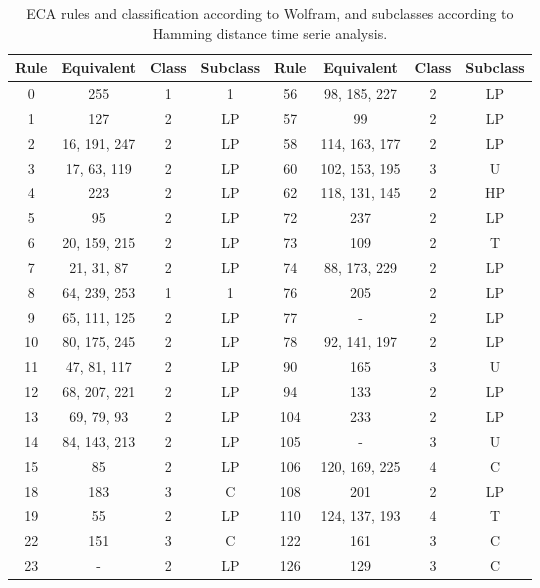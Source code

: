 \setlength{\tabcolsep}{10pt}
\setlength{\tabcolsep}{10pt}
\begin{table}
    \caption{ECA rules and classification according to Wolfram, and subclasses according to Hamming distance time serie analysis.}
    \label{tab:ECAclasses}
    \begin{tabular}{c|c|c|c||c|c|c|c}
        
 Rule & Equivalent & Class & Subclass &   Rule & Equivalent & Class & Subclass \\
        \hline
        0 & 255 & 1 & 1  &               56 & 98, 185, 227 & 2 & LP \\
        1 & 127 & 2 & LP  &              57 & 99 & 2 & LP \\
        2 & 16, 191, 247 & 2 & LP  &     58 & 114, 163, 177 & 2 & LP \\
        3 & 17, 63, 119 & 2 & LP  &      60 & 102, 153, 195 & 3 & U \\
        4 & 223 & 2 & LP  &              62 & 118, 131, 145 & 2 & HP \\
        5 & 95 & 2 & LP  &               72 & 237 & 2 & LP \\
        6 & 20, 159, 215 & 2 & LP &      73 & 109 & 2 & T \\
        7 & 21, 31, 87 & 2 & LP &        74 & 88, 173, 229 & 2 & LP \\
        8 & 64, 239, 253 & 1 & 1 &       76 & 205 & 2 & LP \\
        9 & 65, 111, 125 & 2 & LP &      77 & - & 2 & LP \\
        10 & 80, 175, 245  & 2 & LP &    78 & 92, 141, 197 & 2 & LP \\
        11 & 47, 81, 117 & 2 & LP &      90 & 165 & 3 & U \\
        12 & 68, 207, 221 & 2 & LP &     94 & 133 & 2 & LP \\
        13 & 69, 79, 93 & 2 & LP &       104 & 233 & 2 & LP \\
        14 & 84, 143, 213 & 2 & LP &     105 & - & 3 & U \\
        15 & 85 & 2 & LP &               106 & 120, 169, 225 & 4 & C \\
        18 & 183 & 3 & C &               108 & 201 & 2 & LP \\
        19 & 55 & 2 & LP &               110 & 124, 137, 193 & 4 & T \\
        22 & 151 & 3 & C &               122 & 161 & 3 & C \\
        23 & - & 2 & LP &                126 & 129 & 3 & C \\

\end{tabular}
\end{table}

